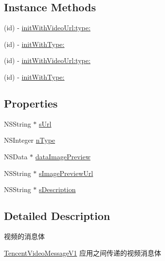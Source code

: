 \subsection*{Instance Methods}
\begin{DoxyCompactItemize}
\item 
(id) -\/ \mbox{\hyperlink{interface_tencent_video_message_v1_a3d00c22af12e872979ab6155985e93ca}{init\+With\+Video\+Url\+:type\+:}}
\item 
(id) -\/ \mbox{\hyperlink{interface_tencent_video_message_v1_aabf89e16fe5a0afd54ddb84ebabcb57e}{init\+With\+Type\+:}}
\item 
(id) -\/ \mbox{\hyperlink{interface_tencent_video_message_v1_a3d00c22af12e872979ab6155985e93ca}{init\+With\+Video\+Url\+:type\+:}}
\item 
(id) -\/ \mbox{\hyperlink{interface_tencent_video_message_v1_aabf89e16fe5a0afd54ddb84ebabcb57e}{init\+With\+Type\+:}}
\end{DoxyCompactItemize}
\subsection*{Properties}
\begin{DoxyCompactItemize}
\item 
N\+S\+String $\ast$ \mbox{\hyperlink{interface_tencent_video_message_v1_a4640f52966eeeac6267e58fd6d2febf9}{s\+Url}}
\item 
N\+S\+Integer \mbox{\hyperlink{interface_tencent_video_message_v1_aa0e6172c120420b16ccdc6ff8fbb4a10}{n\+Type}}
\item 
N\+S\+Data $\ast$ \mbox{\hyperlink{interface_tencent_video_message_v1_a02e60dcf65c8da98cb991099fb19eac7}{data\+Image\+Preview}}
\item 
N\+S\+String $\ast$ \mbox{\hyperlink{interface_tencent_video_message_v1_adb30827798cede4fa36cd2aa66a8f9b0}{s\+Image\+Preview\+Url}}
\item 
N\+S\+String $\ast$ \mbox{\hyperlink{interface_tencent_video_message_v1_af5dd7bffbb25640b8565a2a5debf3c6b}{s\+Description}}
\end{DoxyCompactItemize}


\subsection{Detailed Description}
视频的消息体 

\mbox{\hyperlink{interface_tencent_video_message_v1}{Tencent\+Video\+Message\+V1}} 应用之间传递的视频消息体 

